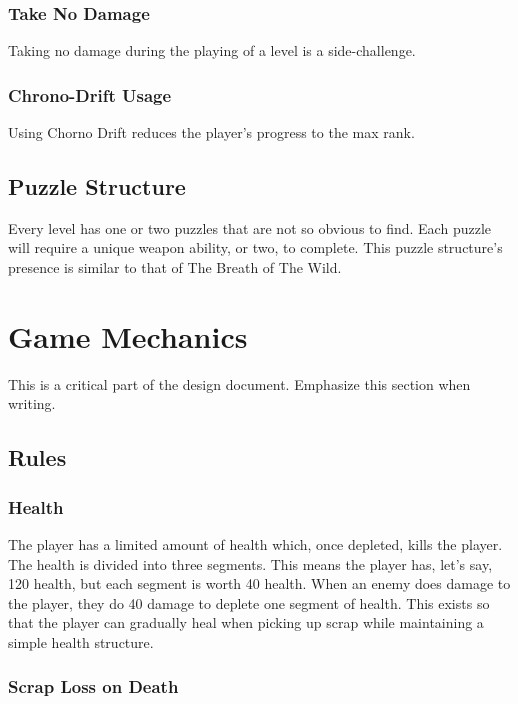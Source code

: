 \documentclass[12pt]{article}
\begin{document}
\subsubsection{Take No Damage}

Taking no damage during the playing of a level is a side-challenge. 

\subsubsection{Chrono-Drift Usage}

Using Chorno Drift reduces the player's progress to the max rank.

\subsection{Puzzle Structure}

Every level has one or two puzzles that are not so obvious to find. Each puzzle will require a unique weapon ability, or two, to complete. This puzzle structure's presence is similar to that of The Breath of The Wild. 

\section{Game Mechanics}

This is a critical part of the design document. Emphasize this section when writing.

\subsection{Rules}

\subsubsection{Health}

The player has a limited amount of health which, once depleted, kills the player. The health is divided into three segments. This means the player has, let's say, 120 health, but each segment is worth 40 health. When an enemy does damage to the player, they do 40 damage to deplete one segment of health. This exists so that the player can gradually heal when picking up scrap while maintaining a simple health structure. 

\subsubsection{Scrap Loss on Death}
\end{document}
